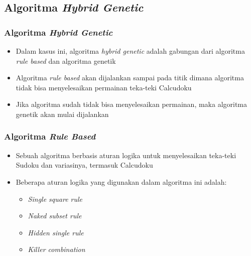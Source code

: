 \documentclass{beamer}
\begin{document}
\subsection{Algoritma \protect\textit{Hybrid Genetic}}

\begin{frame}
\frametitle{Algoritma \textit{Hybrid Genetic}}
\begin{itemize}
\item Dalam kasus ini, algoritma \textit{hybrid genetic} adalah gabungan dari algoritma \textit{rule based} dan algoritma genetik
\item Algoritma \textit{rule based} akan dijalankan sampai pada titik dimana algoritma tidak bisa menyelesaikan permainan teka-teki Calcudoku
\item Jika algoritma sudah tidak bisa menyelesaikan permainan, maka algoritma genetik akan mulai dijalankan
\end{itemize}
\end{frame}


\begin{frame}
\frametitle{Algoritma \textit{Rule Based}}
\begin{itemize}
\item Sebuah algoritma berbasis aturan logika untuk menyelesaikan teka-teki Sudoku dan variasinya, termasuk Calcudoku
\item Beberapa aturan logika yang digunakan dalam algoritma ini adalah:
	\begin{itemize}
 	\item \textit{Single square rule}
	\item \textit{Naked subset rule}
	\item \textit{Hidden single rule}
	\item \textit{Killer combination}
	\end{itemize}
\end{itemize}
\end{frame}

\end{document}
